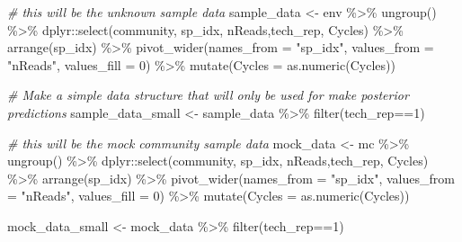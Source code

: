 \documentclass[
]{article}
\newenvironment{Shaded}{\begin{snugshade}}{\end{snugshade}}
\newcommand{\AttributeTok}[1]{\textcolor[rgb]{0.77,0.63,0.00}{#1}}
\newcommand{\CommentTok}[1]{\textcolor[rgb]{0.56,0.35,0.01}{\textit{#1}}}
\newcommand{\DecValTok}[1]{\textcolor[rgb]{0.00,0.00,0.81}{#1}}
\newcommand{\FunctionTok}[1]{\textcolor[rgb]{0.00,0.00,0.00}{#1}}
\newcommand{\NormalTok}[1]{#1}
\newcommand{\OtherTok}[1]{\textcolor[rgb]{0.56,0.35,0.01}{#1}}
\newcommand{\SpecialCharTok}[1]{\textcolor[rgb]{0.00,0.00,0.00}{#1}}
\newcommand{\StringTok}[1]{\textcolor[rgb]{0.31,0.60,0.02}{#1}}
\begin{document}
\begin{Shaded}
\begin{Highlighting}[]
    \CommentTok{\# this will be the unknown sample data}
\NormalTok{    sample\_data }\OtherTok{\textless{}{-}}\NormalTok{ env }\SpecialCharTok{\%\textgreater{}\%} 
      \FunctionTok{ungroup}\NormalTok{() }\SpecialCharTok{\%\textgreater{}\%} 
\NormalTok{      dplyr}\SpecialCharTok{::}\FunctionTok{select}\NormalTok{(community, sp\_idx, nReads,tech\_rep, Cycles) }\SpecialCharTok{\%\textgreater{}\%} 
      \FunctionTok{arrange}\NormalTok{(sp\_idx) }\SpecialCharTok{\%\textgreater{}\%} 
      \FunctionTok{pivot\_wider}\NormalTok{(}\AttributeTok{names\_from =} \StringTok{"sp\_idx"}\NormalTok{, }\AttributeTok{values\_from =} \StringTok{"nReads"}\NormalTok{, }\AttributeTok{values\_fill =} \DecValTok{0}\NormalTok{) }\SpecialCharTok{\%\textgreater{}\%}
      \FunctionTok{mutate}\NormalTok{(}\AttributeTok{Cycles =} \FunctionTok{as.numeric}\NormalTok{(Cycles))}
    
    \CommentTok{\# Make a simple data structure that will only be used for make posterior predictions }
\NormalTok{    sample\_data\_small }\OtherTok{\textless{}{-}}\NormalTok{ sample\_data }\SpecialCharTok{\%\textgreater{}\%} \FunctionTok{filter}\NormalTok{(tech\_rep}\SpecialCharTok{==}\DecValTok{1}\NormalTok{)}
    
    \CommentTok{\# this will be the mock community sample data}
\NormalTok{    mock\_data }\OtherTok{\textless{}{-}}\NormalTok{ mc }\SpecialCharTok{\%\textgreater{}\%} 
      \FunctionTok{ungroup}\NormalTok{() }\SpecialCharTok{\%\textgreater{}\%} 
\NormalTok{      dplyr}\SpecialCharTok{::}\FunctionTok{select}\NormalTok{(community, sp\_idx, nReads,tech\_rep, Cycles) }\SpecialCharTok{\%\textgreater{}\%} 
      \FunctionTok{arrange}\NormalTok{(sp\_idx) }\SpecialCharTok{\%\textgreater{}\%} 
      \FunctionTok{pivot\_wider}\NormalTok{(}\AttributeTok{names\_from =} \StringTok{"sp\_idx"}\NormalTok{, }\AttributeTok{values\_from =} \StringTok{"nReads"}\NormalTok{, }\AttributeTok{values\_fill =} \DecValTok{0}\NormalTok{) }\SpecialCharTok{\%\textgreater{}\%}
      \FunctionTok{mutate}\NormalTok{(}\AttributeTok{Cycles =} \FunctionTok{as.numeric}\NormalTok{(Cycles))}

\NormalTok{    mock\_data\_small }\OtherTok{\textless{}{-}}\NormalTok{ mock\_data }\SpecialCharTok{\%\textgreater{}\%} \FunctionTok{filter}\NormalTok{(tech\_rep}\SpecialCharTok{==}\DecValTok{1}\NormalTok{)}


\end{Highlighting}
\end{Shaded}
\end{document}
